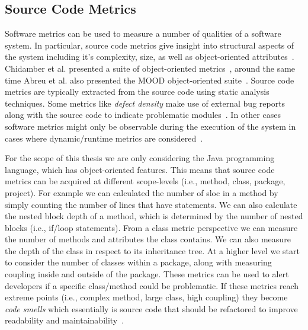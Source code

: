 \subsection{Source Code Metrics}
\label{subsec:background_source_code_metrics}
Software metrics can be used to measure a number of qualities of a software system. In particular, source code metrics give insight into structural aspects of the system including it's complexity, size, as well as object-oriented attributes~\cite{McCa76, Kan02, HWY09, Hend95, SRD12}. Chidamber et al. presented a suite of object-oriented metrics~\cite{CK94}, around the same time Abreu et al. also presented the MOOD object-oriented suite~\cite{AC94}. Source code metrics are typically extracted from the source code using static analysis techniques. Some metrics like \emph{defect density} make use of external bug reports along with the source code to indicate problematic modules~\cite{FP98}. In other cases software metrics might only be observable during the execution of the system in cases where dynamic/runtime metrics are considered~\cite{SS08}.

For the scope of this thesis we are only considering the Java programming language, which has object-oriented features. This means that source code metrics can be acquired at different scope-levels (i.e., method, class, package, project). For example we can calculated the number of \gls{sloc} in a method by simply counting the number of lines that have statements. We can also calculate the nested block depth of a method, which is determined by the number of nested blocks (i.e., if/loop statements). From a class metric perspective we can measure the number of methods and attributes the class contains. We can also measure the depth of the class in respect to its inheritance tree. At a higher level we start to consider the number of classes within a package, along with measuring coupling inside and outside of the package. These metrics can be used to alert developers if a specific class/method could be problematic. If these metrics reach extreme points (i.e., complex method, large class, high coupling) they become \emph{code smells} which essentially is source code that should be refactored to improve readability and maintainability~\cite{FB99}.


